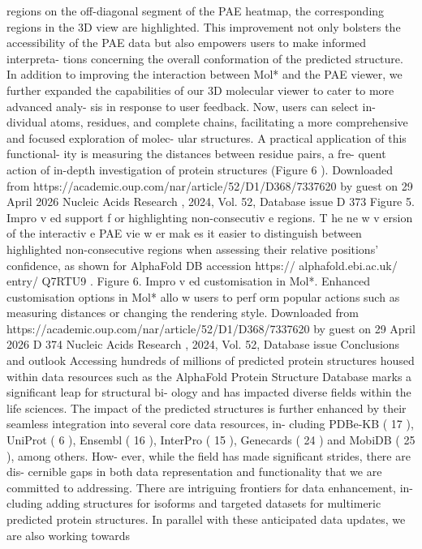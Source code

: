 regions on the off-diagonal segment of the PAE heatmap, the
corresponding regions in the 3D view are highlighted. This
improvement not only bolsters the accessibility of the PAE
data but also empowers users to make informed interpreta-
tions concerning the overall conformation of the predicted
structure.
In addition to improving the interaction between Mol*
and the PAE viewer, we further expanded the capabilities of
our 3D molecular viewer to cater to more advanced analy-
sis in response to user feedback. Now, users can select in-
dividual atoms, residues, and complete chains, facilitating
a more comprehensive and focused exploration of molec-
ular structures. A practical application of this functional-
ity is measuring the distances between residue pairs, a fre-
quent action of in-depth investigation of protein structures
(Figure 6 ).
Downloaded from https://academic.oup.com/nar/article/52/D1/D368/7337620 by guest on 29 April 2026
Nucleic Acids Research , 2024, Vol. 52, Database issue
D 373
Figure 5. Impro v ed support f or highlighting non-consecutiv e regions. T he ne w v ersion of the interactiv e PAE vie w er mak es it easier to distinguish
between highlighted non-consecutive regions when assessing their relative positions’ confidence, as shown for AlphaFold DB accession
https:// alphafold.ebi.ac.uk/ entry/ Q7RTU9 .
Figure 6. Impro v ed customisation in Mol*. Enhanced customisation options in Mol* allo w users to perf orm popular actions such as measuring
distances or changing the rendering style.
Downloaded from https://academic.oup.com/nar/article/52/D1/D368/7337620 by guest on 29 April 2026
D 374
Nucleic Acids Research , 2024, Vol. 52, Database issue
Conclusions and outlook
Accessing hundreds of millions of predicted protein structures
housed within data resources such as the AlphaFold Protein
Structure Database marks a significant leap for structural bi-
ology and has impacted diverse fields within the life sciences.
The impact of the predicted structures is further enhanced by
their seamless integration into several core data resources, in-
cluding PDBe-KB ( 17 ), UniProt ( 6 ), Ensembl ( 16 ), InterPro
( 15 ), Genecards ( 24 ) and MobiDB ( 25 ), among others. How-
ever, while the field has made significant strides, there are dis-
cernible gaps in both data representation and functionality
that we are committed to addressing.
There are intriguing frontiers for data enhancement, in-
cluding adding structures for isoforms and targeted datasets
for multimeric predicted protein structures. In parallel with
these anticipated data updates, we are also working towards
